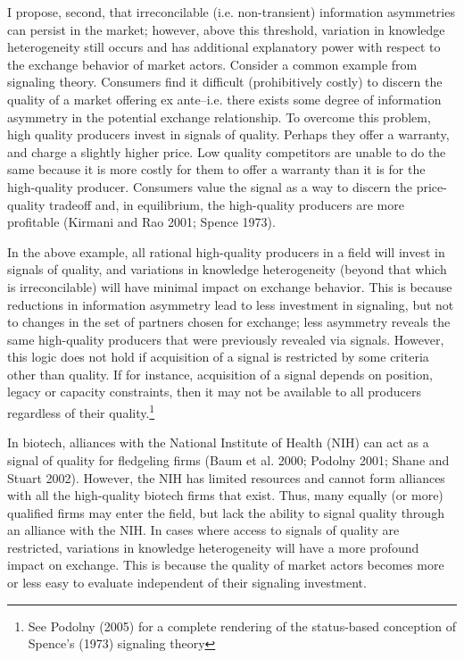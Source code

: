 I propose, second, that irreconcilable (i.e. non-transient) information asymmetries can persist in the market; however, above this threshold, variation in knowledge heterogeneity still occurs and has additional explanatory power with respect to the exchange behavior of market actors. Consider a common example from signaling theory. Consumers find it difficult (prohibitively costly) to discern the quality of a market offering ex ante--i.e. there exists some degree of information asymmetry in the potential exchange relationship. To overcome this problem, high quality producers invest in signals of quality. Perhaps they offer a warranty, and charge a slightly higher price. Low quality competitors are unable to do the same because it is more costly for them to offer a warranty than it is for the high-quality producer. Consumers value the signal as a way to discern the price-quality tradeoff and, in equilibrium, the high-quality producers are more profitable (Kirmani and Rao 2001; Spence 1973).

In the above example, all rational high-quality producers in a field will invest in signals of quality, and variations in knowledge heterogeneity (beyond that which is irreconcilable) will have minimal impact on exchange behavior. This is because reductions in information asymmetry lead to less investment in signaling, but not to changes in the set of partners chosen for exchange; less asymmetry reveals the same high-quality producers that were previously revealed via signals. However, this logic does not hold if acquisition of a signal is restricted by some criteria other than quality. If for instance, acquisition of a signal depends on position, legacy or capacity constraints, then it may not be available to all producers regardless of their quality.\footnote{See Podolny (2005) for a complete rendering of the status-based conception of Spence's (1973) signaling theory} 

In biotech, alliances with the National Institute of Health (NIH) can act as a signal of quality for fledgeling firms (Baum et al. 2000; Podolny 2001; Shane and Stuart 2002). However, the NIH has limited resources and cannot form alliances with all the high-quality biotech firms that exist. Thus, many equally (or more) qualified firms may enter the field, but lack the ability to signal quality through an alliance with the NIH. In cases where access to signals of quality are restricted, variations in knowledge heterogeneity will have a more profound impact on exchange. This is because the quality of market actors becomes more or less easy to evaluate independent of their signaling investment. 

